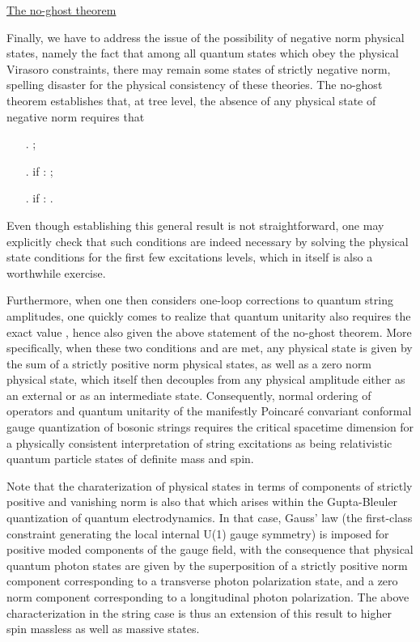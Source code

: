 \documentclass[a4paper,11pt]{article}
\begin{document}
\vspace{10pt}

\noindent\underline{The no-ghost theorem}

\vspace{10pt}

Finally, we have to address the issue of the possibility of negative norm
physical states, namely the fact that among all quantum states which obey
the physical Virasoro constraints, there may remain some states of 
strictly negative 
norm, spelling disaster for the physical consistency of these theories.
The no-ghost theorem\cite{Pol,GSW,JG10} establishes that, at tree level, 
the absence of any physical state of negative norm requires that
\begin{itemize}
\item[.] \coordHE{};
\item[.] if \coordHE{}: \coordHE{};
\item[.] if \coordHE{}: \coordHE{}.
\end{itemize}
Even though establishing this general result is not straightforward, one
may explicitly check that such conditions are indeed necessary by solving
the phy\-si\-cal state conditions for the first few excitations levels, which
in itself is also a worthwhile exercise.

Furthermore, when one then considers one-loop corrections to quantum
string amplitudes, one quickly comes to realize that quantum unitarity also
requires\cite{Pol,GSW} the exact value \coordHE{}, hence also \coordHE{} given 
the above statement
of the no-ghost theorem. More specifically, when these two conditions
\coordHE{} and \coordHE{} are met, any physical state is given by the sum of a strictly
positive norm physical states, as well as a zero norm physical state,
which itself then decouples from any physical amplitude either as an
external or as an intermediate state. Consequently, normal ordering of
operators and quantum unitarity of the manifestly Poincar\'e convariant
conformal gauge quantization of bosonic strings requires the critical
spacetime dimension \coordHE{} for a physically consistent interpretation
of string excitations as being relativistic quantum particle states of
definite mass and spin.

Note that the charaterization of physical states in terms of components
of strictly positive and vanishing norm is also that which arises within
the Gupta-Bleuler quantization of quantum electrodynamics. In that case,
Gauss' law (the first-class constraint generating the local internal U(1)
gauge symmetry) is imposed for positive moded components of the gauge field,
with the consequence that physical quantum photon states are given by
the superposition of a strictly positive norm component corresponding to a
transverse photon polarization state, and a zero norm component corresponding
to a longitudinal photon polarization. The above characterization in the
string case is thus an extension of this result to higher spin massless 
as well as massive states.
\end{document}
